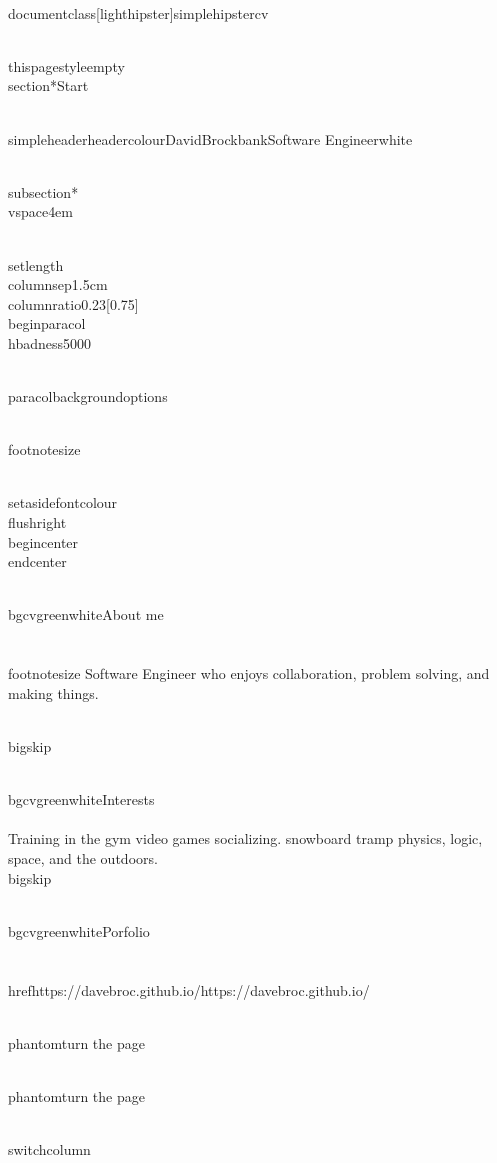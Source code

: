 \\documentclass[lighthipster]{simplehipstercv}
\begin{document}
    
    
    \\thispagestyle{empty}
    \\section*{Start}
    
    \\simpleheader{headercolour}{David}{Brockbank}{Software Engineer}{white}
    
    
    \\subsection*{}
    \\vspace{4em}
    
    \\setlength{\\columnsep}{1.5cm}
    \\columnratio{0.23}[0.75]
    \\begin{paracol}{2}
    \\hbadness5000
    
    \\paracolbackgroundoptions
    
    
    
    \\footnotesize
    {\\setasidefontcolour
    \\flushright
    \\begin{center}
    \\end{center}
    
    \\bg{cvgreen}{white}{About me}\\\\[0.5em]
    
    {\\footnotesize
Software Engineer who enjoys collaboration, problem solving, and making things.
}
    
    \\bigskip
    
    \\bg{cvgreen}{white}{Interests}\\\\[0.5em]
    Training in the gym video games socializing.
snowboard tramp physics, logic, space, and the outdoors.
    \\bigskip

    \\bg{cvgreen}{white}{Porfolio}\\\\[0.5em]
    \\href{https://davebroc.github.io/}{https://davebroc.github.io/}

  
    \\phantom{turn the page}
    
    \\phantom{turn the page}
    }
    \\switchcolumn
    
\end{document}
